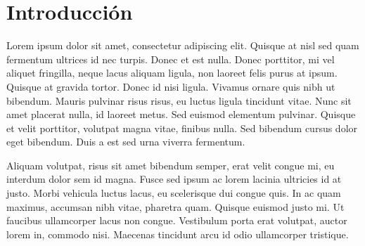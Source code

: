 \section{Introducción}
Lorem ipsum dolor sit amet, consectetur adipiscing elit. Quisque at nisl sed quam fermentum ultrices id nec turpis. Donec et est nulla. Donec porttitor, mi vel aliquet fringilla, neque lacus aliquam ligula, non laoreet felis purus at ipsum. Quisque at gravida tortor. Donec id nisi ligula. Vivamus ornare quis nibh ut bibendum. Mauris pulvinar risus risus, eu luctus ligula tincidunt vitae. Nunc sit amet placerat nulla, id laoreet metus. Sed euismod elementum pulvinar. Quisque et velit porttitor, volutpat magna vitae, finibus nulla. Sed bibendum cursus dolor eget bibendum. Duis a est sed urna viverra fermentum.

Aliquam volutpat, risus sit amet bibendum semper, erat velit congue mi, eu interdum dolor sem id magna. Fusce sed ipsum ac lorem lacinia ultricies id at justo. Morbi vehicula luctus lacus, eu scelerisque dui congue quis. In ac quam maximus, accumsan nibh vitae, pharetra quam. Quisque euismod justo mi. Ut faucibus ullamcorper lacus non congue. Vestibulum porta erat volutpat, auctor lorem in, commodo nisi. Maecenas tincidunt arcu id odio ullamcorper tristique.
